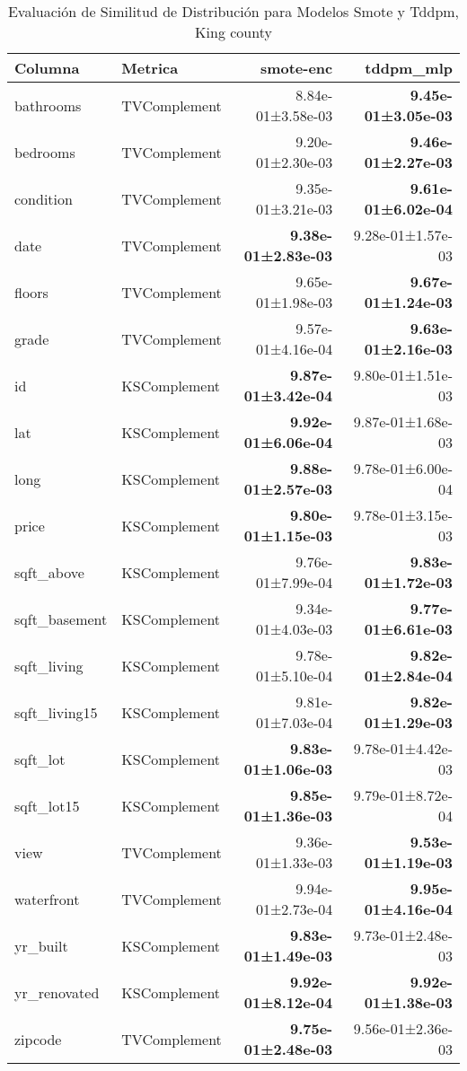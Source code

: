\begin{table}[H]
\centering
\caption{Evaluación de Similitud de Distribución para Modelos Smote y Tddpm, King county}
\label{table-shape-king county-a}
\begin{tabular}{|l|l|r|r|}
\hline
\rowcolor[gray]{0.8}
Columna & Metrica & smote-enc & tddpm\_mlp \\
\hline bathrooms & TVComplement & \cellcolor[rgb]{0.9, 0.54, 0.52} 8.84e-01±3.58e-03 & \bfseries 9.45e-01±3.05e-03 \\
\hline bedrooms & TVComplement & 9.20e-01±2.30e-03 & \bfseries 9.46e-01±2.27e-03 \\
\hline condition & TVComplement & 9.35e-01±3.21e-03 & \bfseries 9.61e-01±6.02e-04 \\
\hline date & TVComplement & \bfseries 9.38e-01±2.83e-03 & \cellcolor[rgb]{0.9, 0.54, 0.52} 9.28e-01±1.57e-03 \\
\hline floors & TVComplement & 9.65e-01±1.98e-03 & \bfseries 9.67e-01±1.24e-03 \\
\hline grade & TVComplement & 9.57e-01±4.16e-04 & \bfseries 9.63e-01±2.16e-03 \\
\hline id & KSComplement & \bfseries 9.87e-01±3.42e-04 & 9.80e-01±1.51e-03 \\
\hline lat & KSComplement & \bfseries 9.92e-01±6.06e-04 & 9.87e-01±1.68e-03 \\
\hline long & KSComplement & \bfseries 9.88e-01±2.57e-03 & 9.78e-01±6.00e-04 \\
\hline price & KSComplement & \bfseries 9.80e-01±1.15e-03 & 9.78e-01±3.15e-03 \\
\hline sqft\_above & KSComplement & 9.76e-01±7.99e-04 & \bfseries 9.83e-01±1.72e-03 \\
\hline sqft\_basement & KSComplement & 9.34e-01±4.03e-03 & \bfseries 9.77e-01±6.61e-03 \\
\hline sqft\_living & KSComplement & 9.78e-01±5.10e-04 & \bfseries 9.82e-01±2.84e-04 \\
\hline sqft\_living15 & KSComplement & 9.81e-01±7.03e-04 & \bfseries 9.82e-01±1.29e-03 \\
\hline sqft\_lot & KSComplement & \bfseries 9.83e-01±1.06e-03 & 9.78e-01±4.42e-03 \\
\hline sqft\_lot15 & KSComplement & \bfseries 9.85e-01±1.36e-03 & 9.79e-01±8.72e-04 \\
\hline view & TVComplement & 9.36e-01±1.33e-03 & \bfseries 9.53e-01±1.19e-03 \\
\hline waterfront & TVComplement & 9.94e-01±2.73e-04 & \bfseries 9.95e-01±4.16e-04 \\
\hline yr\_built & KSComplement & \bfseries 9.83e-01±1.49e-03 & 9.73e-01±2.48e-03 \\
\hline yr\_renovated & KSComplement & \bfseries 9.92e-01±8.12e-04 & \bfseries 9.92e-01±1.38e-03 \\
\hline zipcode & TVComplement & \bfseries 9.75e-01±2.48e-03 & 9.56e-01±2.36e-03 \\
\hline
\end{tabular}
\end{table}
